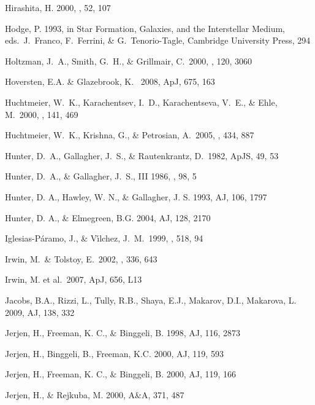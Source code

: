 \documentclass[12pt,preprint]{emulateapj}
\begin{document}
\begin{thebibliography}{}
Hirashita, H. 2000, \pasj , 52, 107

Hodge, P. 1993, in Star Formation, Galaxies, and the Interstellar Medium,
   eds.\ J.\ Franco, F.\ Ferrini, \& G.\ Tenorio-Tagle, Cambridge University 
   Press, 294

Holtzman, J.~A., Smith, G.~H., \& Grillmair, C.\ 2000, \aj, 120, 3060 

Hoversten, E.A. \& Glazebrook, K. \ 2008, ApJ, 675, 163 

Huchtmeier, W.~K., Karachentsev, I.~D., Karachentseva, V.~E., \& 
   Ehle, M.\ 2000, \aaps, 141, 469 

Huchtmeier, W.~K., Krishna, G., \& Petrosian, A.\ 2005, \aap, 434, 887 

Hunter, D.~A., Gallagher, J.~S., \& Rautenkrantz, D.\ 1982, ApJS, 49, 53

Hunter, D.~A., \& Gallagher, J.~S., III 1986, \pasp, 98, 5 

Hunter, D. A., Hawley, W. N., \& Gallagher, J. S. 1993, AJ, 106, 1797

Hunter, D. A., \& Elmegreen, B.G. 2004, AJ, 128, 2170

Iglesias-P{\'a}ramo, J., \& V{\'{\i}}lchez, J.~M.\ 1999, \apj, 518, 94 

Irwin, M.~\& Tolstoy, E.\ 2002, \mnras, 336, 643 

Irwin, M. et al.\ 2007, ApJ, 656, L13 

Jacobs, B.A., Rizzi, L., Tully, R.B., Shaya, E.J., Makarov, D.I., Makarova, L. 2009, AJ, 138, 332
 
Jerjen, H., Freeman, K. C., \& Binggeli, B. 1998, AJ, 116, 2873

Jerjen, H., Binggeli, B., Freeman, K.C. 2000, AJ, 119, 593 

Jerjen, H., Freeman, K. C., \& Binggeli, B. 2000, AJ, 119, 166 
 
Jerjen, H., \& Rejkuba, M. 2000, A\&A, 371, 487 


\end{thebibliography}
\end{document}
